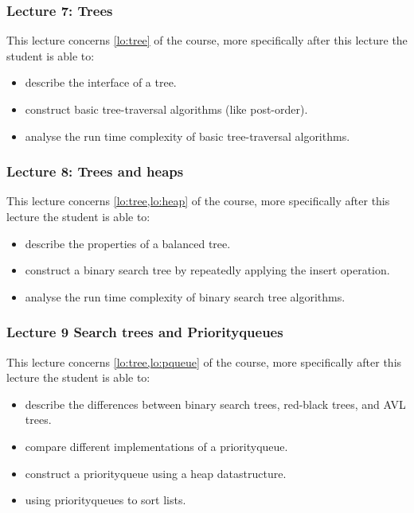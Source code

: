 \subsubsection*{Lecture 7: Trees}
\label{sub:lecture_7}

This lecture concerns \cref{lo:tree} of the course, more specifically after this lecture the student is able
to:
\begin{itemize}
	\item describe the interface of a tree.
	\item construct basic tree-traversal algorithms (like post-order).
	\item analyse the run time complexity of basic tree-traversal algorithms.
\end{itemize}

\subsubsection*{Lecture 8: Trees and heaps}
\label{sub:lecture_8}

This lecture concerns \cref{lo:tree,lo:heap} of the course, more specifically after this lecture the student is able
to:
\begin{itemize}
	\item describe the properties of a balanced tree.
	\item construct a binary search tree by repeatedly applying the insert operation.
	\item analyse the run time complexity of binary search tree algorithms.
\end{itemize}

\subsubsection*{Lecture 9 Search trees and Priorityqueues}
\label{sub:lecture_9}

This lecture concerns \cref{lo:tree,lo:pqueue} of the course, more specifically after this lecture the student is able
to:
\begin{itemize}
	\item describe the differences between binary search trees, red-black trees, and AVL trees.
	\item compare different implementations of a priorityqueue.
	\item construct a priorityqueue using a heap datastructure.
	\item using priorityqueues to sort lists.
\end{itemize}

